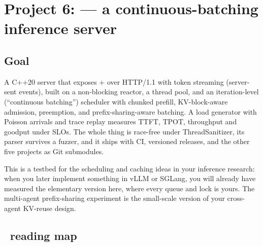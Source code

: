 \chapter{Project 6:  --- a continuous-batching inference server}
\label{ch:p6}

\section{Goal}

A C++20 server that exposes  +  over HTTP/1.1 with token streaming (server-sent events), built on a non-blocking  reactor, a thread pool, and an iteration-level (``continuous batching'') scheduler with chunked prefill, KV-block-aware admission, preemption, and prefix-sharing-aware batching. A load generator with Poisson arrivals and trace replay measures TTFT, TPOT, throughput and goodput under SLOs. The whole thing is race-free under ThreadSanitizer, its parser survives a fuzzer, and it ships with CI, versioned releases, and the other five projects as Git submodules.

\begin{hook}
This is a testbed for the scheduling and caching ideas in your inference research: when you later implement something in vLLM or SGLang, you will already have measured the elementary version here, where every queue and lock is yours. The multi-agent prefix-sharing experiment is the small-scale version of your cross-agent KV-reuse design.
\end{hook}

\section{\csapp\ reading map}

